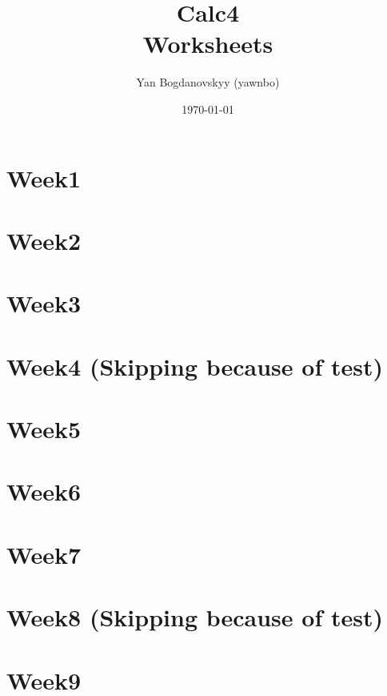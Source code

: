\documentclass{report}
\title{\Huge{Calc4}\\ Worksheets}
\author{\huge{Yan Bogdanovskyy (yawnbo)}}
\date{\today}
\begin{document}
\maketitle
\tableofcontents
\pagebreak

\begin{multicols}{2}
\chapter{Week1}


\chapter{Week2}


\chapter{Week3}


\chapter{Week4 (Skipping because of test) }
\chapter{Week5}


\chapter{Week6}


\chapter{Week7}


\chapter{Week8 (Skipping because of test)}

\chapter{Week9}

\end{multicols}
\end{document}
